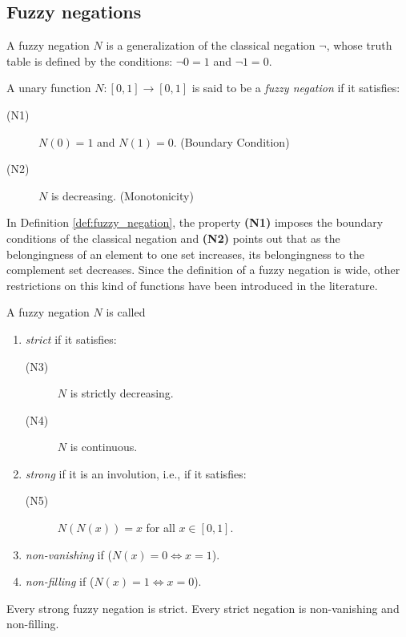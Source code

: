 \subsection{Fuzzy negations}
A fuzzy negation $N$ is a generalization of the classical negation $\neg$, whose truth table is defined by the conditions: $\neg 0=1$ and $\neg 1 =0$.
\begin{definition}\label{def:fuzzy_negation}
	A unary function $N:[0,1] \to [0,1]$ is said to be a \emph{fuzzy negation} if it satisfies:
	\begin{description}
		\item[(N1)] $N(0)=1$ and $N(1)=0$. \hfill (Boundary Condition)
		\item[(N2)] $N$ is decreasing. \hfill (Monotonicity)
	\end{description}
\end{definition}
In Definition \ref{def:fuzzy_negation}, the property {\bf (N1)} imposes the boundary conditions of the classical negation and {\bf (N2)} points out that as the belongingness of an element to one set increases, its belongingness to the complement set decreases. Since the definition of a fuzzy negation is wide, other restrictions on this kind of functions have been introduced in the literature.
\begin{definition} A fuzzy negation $N$ is called
	\begin{enumerate}[label=(\roman*)]
		\item  \emph{strict} if it satisfies:
		\begin{description}
			\item[(N3)] $N$ is strictly decreasing.
			\item[(N4)] $N$ is continuous.
		\end{description}
		\item \emph{strong} if it is an involution, i.e., if it satisfies:
		\begin{description}
			\item[(N5)] $N(N(x))=x$ for all $x \in [0,1]$.
		\end{description}
		\item \emph{non-vanishing} if ($N(x)=0 \Leftrightarrow x=1$).
		\item \emph{non-filling} if ($N(x)=1 \Leftrightarrow x=0$).
	\end{enumerate}
\end{definition}

\begin{corollary}
	Every strong fuzzy negation is strict. Every strict negation is non-vanishing and non-filling.
\end{corollary}

